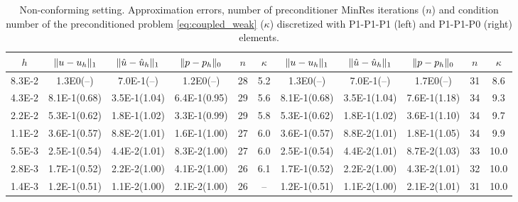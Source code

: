 \documentclass[r]{siamart171218}
\begin{document}
\begin{table}
  \begin{center}
    \scriptsize{
  \begin{tabular}{c|ccc|c|c||ccc|c|c}
    \hline
    $h$ & $\lVert{u-u_h}\rVert_1$ & $\lVert{\hat{u}-\hat{u}_h}\rVert_1$ & $\lVert{p-p_h}\rVert_0$ & $n$ & $\kappa$
        & $\lVert{u-u_h}\rVert_1$ & $\lVert{\hat{u}-\hat{u}_h}\rVert_1$ & $\lVert{p-p_h}\rVert_0$ & $n$ & $\kappa$ \\
    \hline
8.3E-2 & 1.3E0(--)    & 7.0E-1(--)   & 1.2E0(--)    & 28 & 5.2 & 1.3E0(--)    & 7.0E-1(--)   & 1.7E0(--)     & 31 & 8.6\\   
4.3E-2 & 8.1E-1(0.68) & 3.5E-1(1.04) & 6.4E-1(0.95) & 29 & 5.6 & 8.1E-1(0.68) & 3.5E-1(1.04) & 7.6E-1(1.18)  & 34 & 9.3\\ 
2.2E-2 & 5.3E-1(0.62) & 1.8E-1(1.02) & 3.3E-1(0.99) & 29 & 5.8 & 5.3E-1(0.62) & 1.8E-1(1.02) & 3.6E-1(1.10)  & 34 & 9.7\\ 
1.1E-2 & 3.6E-1(0.57) & 8.8E-2(1.01) & 1.6E-1(1.00) & 27 & 6.0 & 3.6E-1(0.57) & 8.8E-2(1.01) & 1.8E-1(1.05)  & 34 & 9.9\\ 
5.5E-3 & 2.5E-1(0.54) & 4.4E-2(1.01) & 8.3E-2(1.00) & 27 & 6.0 & 2.5E-1(0.54) & 4.4E-2(1.01) & 8.7E-2(1.03)  & 33 & 10.0\\
2.8E-3 & 1.7E-1(0.52) & 2.2E-2(1.00) & 4.1E-2(1.00) & 26 & 6.1 & 1.7E-1(0.52) & 2.2E-2(1.00) & 4.3E-2(1.01)  & 32 & 10.0\\
1.4E-3 & 1.2E-1(0.51) & 1.1E-2(1.00) & 2.1E-2(1.00) & 26 & --  & 1.2E-1(0.51) & 1.1E-2(1.00) & 2.1E-2(1.01)  & 31 & 10.0\\
    \hline
  \end{tabular}
    }
    \caption{Non-conforming setting. Approximation errors, number of preconditioner MinRes iterations ($n$) and
      condition number of the preconditioned problem \eqref{eq:coupled_weak} ($\kappa$) discretized
      with P1-P1-P1 (left) and P1-P1-P0 (right) elements.}
  \label{tab:coupled_non}
  \end{center}
\end{table}




\end{document}
